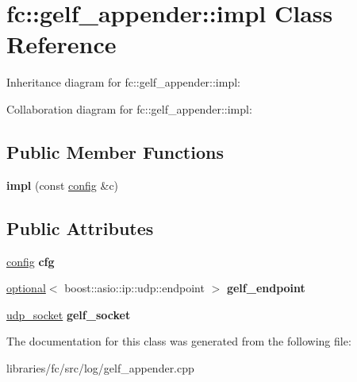 \hypertarget{classfc_1_1gelf__appender_1_1impl}{}\section{fc\+:\+:gelf\+\_\+appender\+:\+:impl Class Reference}
\label{classfc_1_1gelf__appender_1_1impl}


Inheritance diagram for fc\+:\+:gelf\+\_\+appender\+:\+:impl\+:


Collaboration diagram for fc\+:\+:gelf\+\_\+appender\+:\+:impl\+:
\subsection*{Public Member Functions}
\begin{DoxyCompactItemize}
\item 
\mbox{\label{classfc_1_1gelf__appender_1_1impl_afdd57661530f76c819bdeefdc3843ad3}} 
{\bfseries impl} (const \mbox{\hyperlink{structfc_1_1gelf__appender_1_1config}{config}} \&c)
\end{DoxyCompactItemize}
\subsection*{Public Attributes}
\begin{DoxyCompactItemize}
\item 
\mbox{\label{classfc_1_1gelf__appender_1_1impl_a7683f0beb1017eb880d31371cf782a12}} 
\mbox{\hyperlink{structfc_1_1gelf__appender_1_1config}{config}} {\bfseries cfg}
\item 
\mbox{\label{classfc_1_1gelf__appender_1_1impl_aa1a785931fbed635b13845a50373f17f}} 
\mbox{\hyperlink{classfc_1_1optional}{optional}}$<$ boost\+::asio\+::ip\+::udp\+::endpoint $>$ {\bfseries gelf\+\_\+endpoint}
\item 
\mbox{\label{classfc_1_1gelf__appender_1_1impl_a5dab5ac04f505ecd7b9970df45111ef6}} 
\mbox{\hyperlink{classfc_1_1udp__socket}{udp\+\_\+socket}} {\bfseries gelf\+\_\+socket}
\end{DoxyCompactItemize}


The documentation for this class was generated from the following file\+:\begin{DoxyCompactItemize}
\item 
libraries/fc/src/log/gelf\+\_\+appender.\+cpp\end{DoxyCompactItemize}
